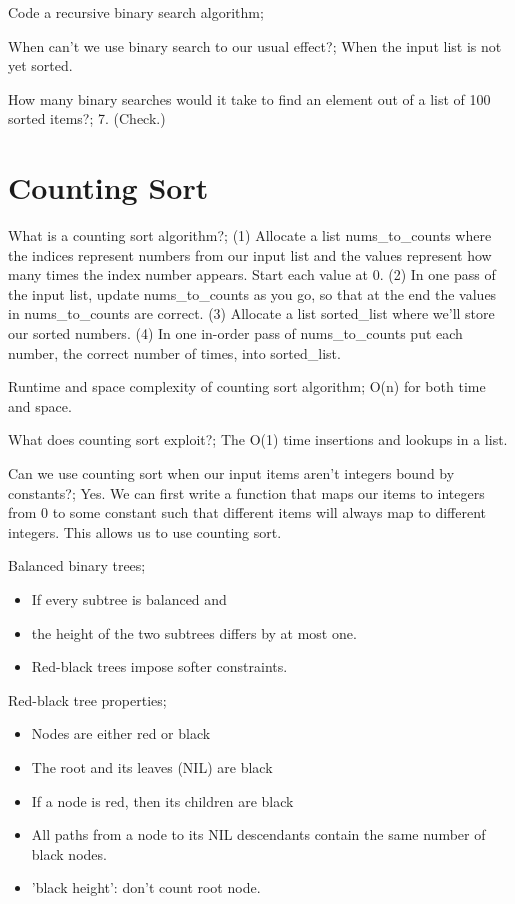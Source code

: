 \documentclass{article}
\begin{document}
Code a recursive binary search algorithm; 

When can’t we use binary search to our usual effect?; When the input list is not yet sorted.

How many binary searches would it take to find an element out of a list of 100 sorted items?; 7. (Check.)

\section{Counting Sort}

What is a counting sort algorithm?; (1) Allocate a list nums_to_counts where the indices represent numbers from our input list and the values represent how many times the index number appears. Start each value at 0. (2) In one pass of the input list, update nums_to_counts as you go, so that at the end the values in nums_to_counts are correct. (3) Allocate a list sorted_list where we'll store our sorted numbers. (4) In one in-order pass of nums_to_counts put each number, the correct number of times, into sorted_list.

Runtime and space complexity of counting sort algorithm; O(n) for both time and space.

What does counting sort exploit?; The O(1) time insertions and lookups in a list.

Can we use counting sort when our input items aren’t integers bound by constants?; Yes. We can first write a function that maps our items to integers from 0 to some constant such that different items will always map to different integers. This allows us to use counting sort.

Balanced binary trees; \begin{itemize}
	\item If every subtree is balanced and \item the height of the two subtrees differs by at most one.
	\item Red-black trees impose softer constraints.
\end{itemize}

Red-black tree properties; \begin{itemize}
	\item Nodes are either red or black
	\item The root and its leaves (NIL) are black
	\item If a node is red, then its children are black
	\item All paths from a node to its NIL descendants contain the same number of black nodes.
	\item 'black height': don't count root node.
\end{itemize}
\end{document}
